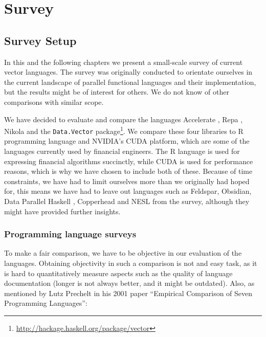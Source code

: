 \part{Survey}
\chapter{Survey Setup}
In this and the following chapters we present a small-scale survey of
current vector languages. The survey was originally conducted to
orientate ourselves in the current landscape of parallel functional
languages and their implementation, but the results might be of
interest for others. We do not know of other comparisons with similar
scope.

We have decided to evaluate and compare the languages Accelerate
\cite{chakravarty2011accelerating}, Repa \cite{keller2010regular},
Nikola \cite{mainland2010nikola} and the \texttt{Data.Vector}
package\footnote{\url{http://hackage.haskell.org/package/vector}}. We
compare these four libraries to R programming language and NVIDIA's
CUDA platform, which are some of the languages currently used by
financial engineers. The R language is used for expressing financial
algorithms succinctly, while CUDA is used for performance reasons,
which is why we have chosen to include both of these. Because of time
constraints, we have had to limit ourselves more than we originally
had hoped for, this means we have had to leave out languages such as
Feldspar\cite{axelsson2010feldspar},
Obsidian\cite{svensson2011obsidian}, Data Parallel Haskell \cite{},
Copperhead\cite{Catanzaro2011} and NESL\cite{nesl} from the survey,
although they might have provided further insights.


\todo{}

\section{Programming language surveys}
To make a fair comparison, we have to be objective in our evaluation
of the languages. Obtaining objectivity in such a comparison is not
and easy task, as it is hard to quantitatively measure aspects such as
the quality of language documentation (longer is not always better,
and it might be outdated). Also, as mentioned by Lutz Prechelt in his
2001 paper ``Empirical Comparison of Seven Programming Languages'':

